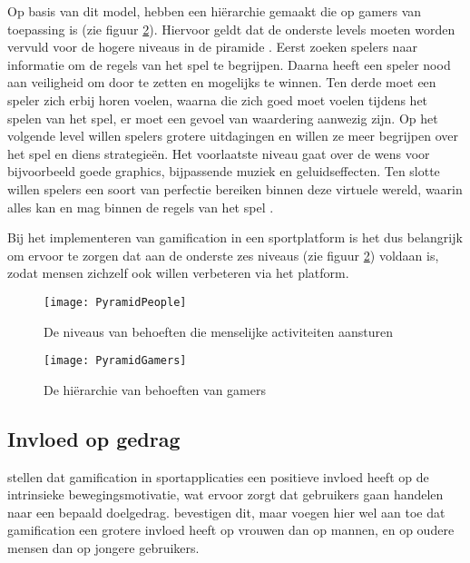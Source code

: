 Op basis van dit model, hebben \textcite{Siang2003} een hiërarchie gemaakt die op gamers van toepassing is (zie figuur \ref{fig:gamers-hierarchy}).
Hiervoor geldt dat de onderste levels moeten worden vervuld voor de hogere niveaus in de piramide \autocite{Richter2014}.
Eerst zoeken spelers naar informatie om de regels van het spel te begrijpen. Daarna heeft een speler nood aan veiligheid om door te zetten en mogelijks te winnen. Ten derde moet een speler zich erbij horen voelen, waarna die zich goed moet voelen tijdens het spelen van het spel, er moet een gevoel van waardering aanwezig zijn. Op het volgende level willen spelers grotere uitdagingen en willen ze meer begrijpen over het spel en diens strategieën. Het voorlaatste niveau gaat over de wens voor bijvoorbeeld goede graphics, bijpassende muziek en geluidseffecten. Ten slotte willen spelers een soort van perfectie bereiken binnen deze virtuele wereld, waarin alles kan en mag binnen de regels van het spel \autocite{Greitzer2007, Siang2003}.

Bij het implementeren van gamification in een sportplatform is het dus belangrijk om ervoor te zorgen dat aan de onderste zes niveaus (zie figuur \ref{fig:gamers-hierarchy}) voldaan is, zodat mensen zichzelf ook willen verbeteren via het platform.

\begin{figure}[h]
    \caption[Behoeften-hiërarchie algemeen]{De  niveaus van behoeften die menselijke activiteiten aansturen \autocite{Lilienfeld2014}}
    \texttt{[image: PyramidPeople]}
    \label{fig:people-hierarchy}
\end{figure}


\begin{figure}[h]
    \caption[Behoeften-hiërarchie gamers]{De hiërarchie van behoeften van gamers \autocite{Richter2014}}
    \texttt{[image: PyramidGamers]}
    \label{fig:gamers-hierarchy}
\end{figure}

\subsection{Invloed op gedrag}
\textcite{Kari2016} stellen dat gamification in sportapplicaties een positieve invloed heeft op de intrinsieke bewegingsmotivatie, wat ervoor zorgt dat gebruikers gaan handelen naar een bepaald doelgedrag. \textcite{PoloPena2020} bevestigen dit, maar voegen hier wel aan toe dat gamification een grotere invloed heeft op vrouwen dan op mannen, en op oudere mensen dan op jongere gebruikers.


